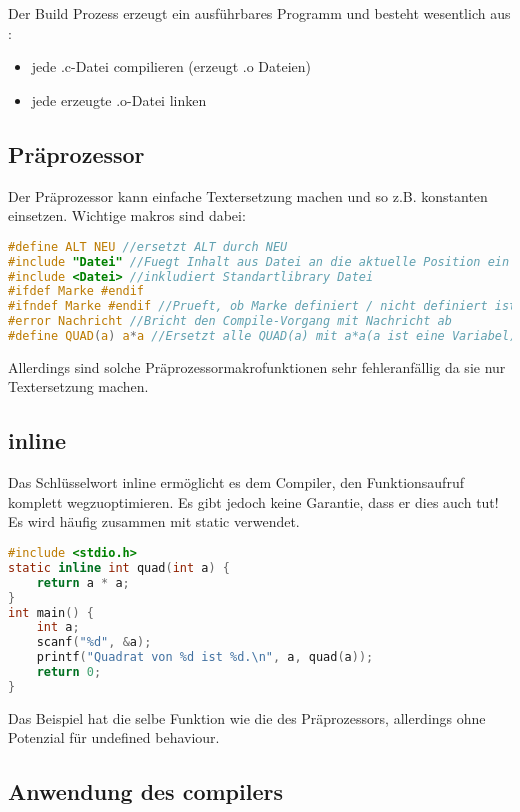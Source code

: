 Der Build Prozess erzeugt ein ausführbares Programm und besteht wesentlich aus :
\begin{itemize}[itemsep=1pt, parsep=0pt]
    \item jede .c-Datei compilieren (erzeugt .o Dateien)
    \item jede erzeugte .o-Datei linken
\end{itemize}


\subsection{Präprozessor}

Der Präprozessor kann einfache Textersetzung machen und so z.B. konstanten einsetzen.\newline
Wichtige makros sind dabei:
\begin{lstlisting}[language = c]
#define ALT NEU //ersetzt ALT durch NEU
#include "Datei" //Fuegt Inhalt aus Datei an die aktuelle Position ein
#include <Datei> //inkludiert Standartlibrary Datei
#ifdef Marke #endif
#ifndef Marke #endif //Prueft, ob Marke definiert / nicht definiert ist.
#error Nachricht //Bricht den Compile-Vorgang mit Nachricht ab
#define QUAD(a) a*a //Ersetzt alle QUAD(a) mit a*a(a ist eine Variabel) Ein beispiel einer Praeprozessormakrofunktion 
\end{lstlisting}

Allerdings sind solche Präprozessormakrofunktionen sehr fehleranfällig da sie nur Textersetzung machen.

\subsection{inline}

Das Schlüsselwort inline ermöglicht es dem Compiler, den Funktionsaufruf komplett wegzuoptimieren. Es gibt jedoch keine Garantie, dass er dies auch tut! Es wird häufig zusammen mit static verwendet.\newline
\begin{lstlisting}[language = c]
#include <stdio.h>
static inline int quad(int a) {
    return a * a;
}
int main() {
    int a;
    scanf("%d", &a);
    printf("Quadrat von %d ist %d.\n", a, quad(a));
    return 0;
}
\end{lstlisting}
Das Beispiel hat die selbe Funktion wie die des Präprozessors, allerdings ohne Potenzial für undefined behaviour.

\subsection{Anwendung des compilers}

